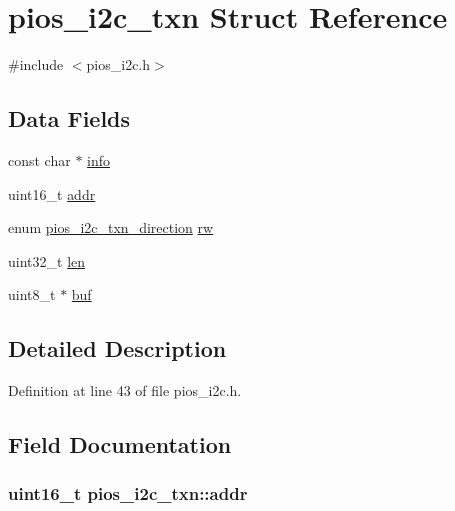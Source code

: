\hypertarget{structpios__i2c__txn}{\section{pios\-\_\-i2c\-\_\-txn \-Struct \-Reference}
\label{structpios__i2c__txn}
}


{\ttfamily \#include $<$pios\-\_\-i2c.\-h$>$}

\subsection*{\-Data \-Fields}
\begin{DoxyCompactItemize}
\item 
const char $\ast$ \hyperlink{structpios__i2c__txn_a202db3e74679d070f4f3d27c1dcb0f39}{info}
\item 
uint16\-\_\-t \hyperlink{structpios__i2c__txn_a22a5ef8fef7182f36899d8410be0dc27}{addr}
\item 
enum \hyperlink{group___p_i_o_s___i2_c_ga317e7ea68e21f759a0326df96f278a2b}{pios\-\_\-i2c\-\_\-txn\-\_\-direction} \hyperlink{structpios__i2c__txn_a604f5e93b6ae3da9573915bc03bb1821}{rw}
\item 
uint32\-\_\-t \hyperlink{structpios__i2c__txn_af238133c1e4df913933e48fc29c5510b}{len}
\item 
uint8\-\_\-t $\ast$ \hyperlink{structpios__i2c__txn_a0d544e19d0f73acb6bf43743bc5e1480}{buf}
\end{DoxyCompactItemize}


\subsection{\-Detailed \-Description}


\-Definition at line 43 of file pios\-\_\-i2c.\-h.



\subsection{\-Field \-Documentation}
\hypertarget{structpios__i2c__txn_a22a5ef8fef7182f36899d8410be0dc27}{
\subsubsection[{addr}]{\setlength{\rightskip}{0pt plus 5cm}uint16\-\_\-t {\bf pios\-\_\-i2c\-\_\-txn\-::addr}}}\label{structpios__i2c__txn_a22a5ef8fef7182f36899d8410be0dc27}


